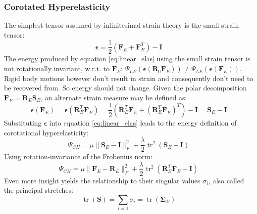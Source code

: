 \documentclass[m,times]{cgMA}
\begin{document}
\subsubsection{Corotated Hyperelasticity}\label{sec:cor_hyper}
The simplest tensor assumed by infinitesimal strain theory is the small strain tensor: \begin{equation}
  \boldsymbol{\epsilon} = \frac { 1 } { 2 } \left( \boldsymbol { F }_E + \boldsymbol { F }_E ^ { T } \right) - \boldsymbol { I }
\end{equation}
The energy produced by equation \ref{eq:linear_elas} using the small strain tensor is not rotationally invariant, w.r.t. to $\boldsymbol{F}_E$: $\Psi_{LE}(\boldsymbol{\epsilon}(\boldsymbol{R}_{0} \boldsymbol{F}_E)) \neq \Psi_{LE}(\boldsymbol{\epsilon}(\boldsymbol{F}_E))$. Rigid body motions however don't result in strain and consequently don't need to be recovered from. So energy should not change. Given the polar decomposition $\boldsymbol{F}_E = \boldsymbol{R}_E\boldsymbol{S}_E$, an alternate strain measure may be defined as:
\begin{equation}
  { \boldsymbol { \epsilon } } ( \boldsymbol { F }_E ) = \boldsymbol { \epsilon } \left( \boldsymbol { R }_E ^ { T } \boldsymbol { F }_E \right) = \frac { 1 } { 2 } \left( \boldsymbol { R }_E ^ { T } \boldsymbol { F }_E + \left( \boldsymbol { R }_E ^ { T } \boldsymbol { F }_E \right) ^ { T } \right) - \boldsymbol { I } = \boldsymbol { S }_E - \boldsymbol { I }
\end{equation}
Substituting $ {\boldsymbol{\epsilon}}$ into equation \ref{eq:linear_elas} leads to the energy definition of corotational hyperelasticity:
\begin{equation}\label{eq:corot_S}
  \Psi_{CH} = \mu \| \boldsymbol{ S }_E - \boldsymbol { I } \| _ { F } ^ { 2 } + \frac { \lambda } { 2 } \operatorname { tr } ^ { 2 } ( \boldsymbol { S }_E - \boldsymbol { I } )
\end{equation}
Using rotation-invariance of the Frobenius norm:
\begin{equation}
  \Psi_{CH} = \mu \| \boldsymbol {F}_E  - \boldsymbol {R}_E \| _ { F } ^ { 2 } + \frac { \lambda } { 2 } \operatorname { tr } ^ { 2 } \left( \boldsymbol { R }_E ^ { T } \boldsymbol { F }_E - \boldsymbol { I } \right)
\end{equation}
Even more insight yields the relationship to their singular values $\sigma _ i$, also called the principal stretches:
$$\operatorname {tr}\left(\boldsymbol{S}\right) = \sum _ { i = 1 } \sigma _ { i } = \operatorname{tr}\left(\boldsymbol{\Sigma}_E\right)$$
\end{document}
